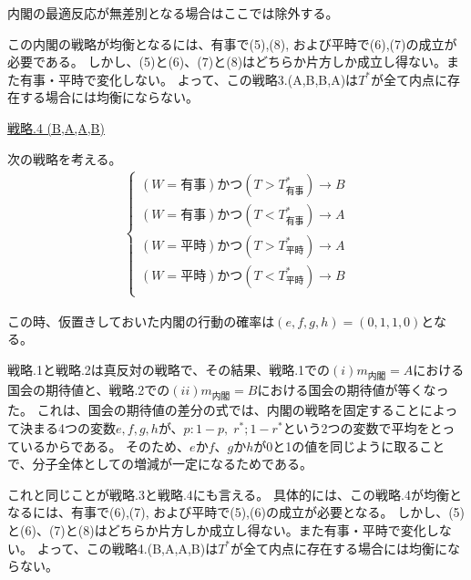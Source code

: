 \documentclass[main.tex]{subfiles}
\begin{document}
内閣の最適反応が無差別となる場合はここでは除外する。

この内閣の戦略が均衡となるには、有事で(5),(8), および平時で(6),(7)の成立が必要である。
しかし、(5)と(6)、(7)と(8)はどちらか片方しか成立し得ない。また有事・平時で変化しない。
よって、この戦略3.(A,B,B,A)は$T^*$が全て内点に存在する場合には均衡にならない。








\bigskip
\noindent
\underline{戦略.4 (B,A,A,B)}


次の戦略を考える。
\begin{align*}
    \begin{cases}
        (W=有事) かつ (T>T^*_{有事})  \rightarrow B\\
        (W=有事) かつ (T<T^*_{有事})  \rightarrow A\\
        (W=平時) かつ (T>T^*_{平時})  \rightarrow A\\
        (W=平時) かつ (T<T^*_{平時})   \rightarrow B\\
    \end{cases}
\end{align*}

この時、仮置きしておいた内閣の行動の確率は$(e,f,g,h) = (0,1,1,0)$となる。


戦略.1と戦略.2は真反対の戦略で、その結果、戦略.1での$(i)m_{内閣}=A$における国会の期待値と、戦略.2での$(ii)m_{内閣}=B$における国会の期待値が等くなった。
これは、国会の期待値の差分の式では、内閣の戦略を固定することによって決まる4つの変数$e,f,g,h$が、$p:1-p,\; r^*;1-r^*$という2つの変数で平均をとっているからである。
そのため、$e$か$f$、$g$か$h$が0と1の値を同じように取ることで、分子全体としての増減が一定になるためである。

これと同じことが戦略.3と戦略.4にも言える。
具体的には、この戦略.4が均衡となるには、有事で(6),(7), および平時で(5),(6)の成立が必要となる。
しかし、(5)と(6)、(7)と(8)はどちらか片方しか成立し得ない。また有事・平時で変化しない。
よって、この戦略4.(B,A,A,B)は$T^*$が全て内点に存在する場合には均衡にならない。
\end{document}
